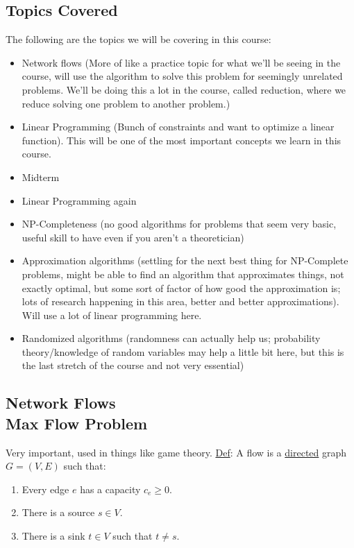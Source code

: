 \documentclass[12 pt]{article}
\begin{document}
           \subsection{Topics Covered}
                The following are the topics we will be covering in
                this course:
                \begin{itemize}
                \item Network flows (More of like a practice topic for
                  what we'll be seeing in the course, will use the
                  algorithm to solve this problem for seemingly
                  unrelated problems. We'll be doing this a lot in the
                  course, called reduction, where we reduce solving
                  one problem to another problem.)
                \item Linear Programming (Bunch of constraints and
                  want to optimize a linear function). This will be
                  one of the most important concepts we learn in this
                  course.
                \item Midterm
                \item Linear Programming again
                \item NP-Completeness (no good algorithms for problems
                  that seem very basic, useful skill to have even if
                  you aren't a theoretician)
                \item Approximation algorithms (settling for the next
                  best thing for NP-Complete problems, might be able
                  to find an algorithm that approximates things, not
                  exactly optimal, but some sort of factor of how good
                  the approximation is; lots of research happening in
                  this area, better and better approximations). Will
                  use a lot of linear programming here.
                \item Randomized algorithms (randomness can actually
                  help us; probability theory/knowledge of random
                  variables may help a little bit here, but this is
                  the last stretch of the course and not very essential)
                \end{itemize}
         \subsection{Network Flows \\ Max Flow Problem}
            Very important, used in things like game theory.
            \underline{Def}: A flow is a \underline{directed} graph
            $G=(V,E)$ such that:
            \begin{enumerate}
            \item Every edge $e$ has a capacity $c_e \geq 0$.
            \item There is a source $s \in V$.
            \item There is a sink $t \in V$ such that $t\neq s$.
            \end{enumerate}
\end{document}
